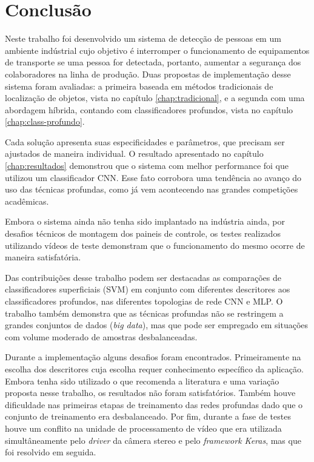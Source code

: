 \chapter{Conclusão} \label{chap:conclusao}

Neste trabalho foi desenvolvido um sistema de detecção de pessoas em um ambiente indústrial cujo objetivo é interromper o funcionamento de equipamentos de transporte se uma pessoa for detectada, portanto, aumentar a segurança dos colaboradores na linha de produção. Duas propostas de implementação desse sistema foram avaliadas: a primeira baseada em métodos tradicionais de localização de objetos, vista no capítulo \ref{chap:tradicional}, e a segunda com uma abordagem híbrida, contando com classificadores profundos, vista no capítulo \ref{chap:class-profundo}. 

Cada solução apresenta suas especificidades e parâmetros, que precisam ser ajustados de maneira individual. O resultado apresentado no capítulo \ref{chap:resultados} demonstrou que o sistema com melhor performance foi que utilizou um classificador CNN. Esse fato corrobora uma tendência ao avanço do uso das técnicas profundas, como já vem acontecendo nas grandes competições acadêmicas.

Embora o sistema ainda não tenha sido implantado na indústria ainda, por desafios técnicos de montagem dos paineis de controle, os testes realizados utilizando vídeos de teste demonstram que o funcionamento do mesmo ocorre de maneira satisfatória. 

Das contribuições desse trabalho podem ser destacadas as comparações de classificadores superficiais (SVM) em conjunto com diferentes descritores aos classificadores profundos, nas diferentes topologias de rede CNN e MLP. O trabalho também demonstra que as técnicas profundas não se restringem a grandes conjuntos de dados (\textit{big data}), mas que pode ser empregado em situações com volume moderado de amostras desbalanceadas.

Durante a implementação alguns desafios foram encontrados. Primeiramente na escolha dos descritores cuja escolha requer conhecimento específico da aplicação. Embora tenha sido utilizado o que recomenda a literatura e uma variação proposta nesse trabalho, os resultados não foram satisfatórios. Também houve dificuldade nas primeiras etapas de treinamento das redes profundas dado que o conjunto de treinamento era desbalanceado. Por fim, durante a fase de testes houve um conflito na unidade de processamento de vídeo que era utilizada simultâneamente pelo \textit{driver} da câmera stereo e pelo \textit{framework Keras}, mas que foi resolvido em seguida.

